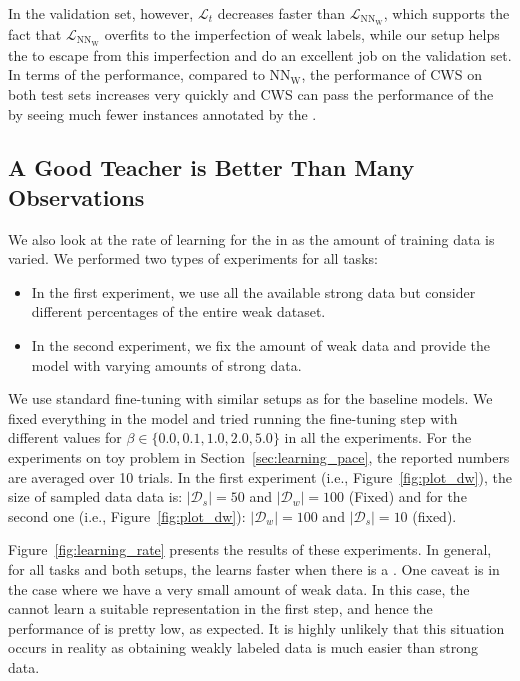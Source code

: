 In the validation set, however, $\mathcal{L}_t$ decreases faster than $\mathcal{L}_{\text{NN}_{\text{W}}}$, which supports the fact that $\mathcal{L}_{\text{NN}_{\text{W}}}$ overfits to the imperfection of weak labels, while our setup helps the \tnet to escape from this imperfection and do an excellent job on the validation set.
%
In terms of the performance, compared to $\text{NN}_{\text{W}}$, the performance of CWS on both test sets increases very quickly and CWS can pass the performance of the \wa by seeing much fewer instances annotated by the \wa.
\subsection{A Good Teacher is Better Than Many Observations} 

We also look at the rate of learning for the \std in \fwl as the amount of training data is varied. We performed two types of experiments for all tasks:
%
\begin{itemize}
    \item In the first experiment, we use all the available strong data but consider different percentages of the entire weak dataset.
    \item In the second experiment, we fix the amount of weak data and provide the model with varying amounts of strong data.
\end{itemize} 
We use standard fine-tuning with similar setups as for the baseline models. 
We fixed everything in the model and tried running the fine-tuning step with different values for $\beta \in \{0.0, 0.1, 1.0, 2.0, 5.0\}$ in all the experiments.
For the experiments on toy problem in Section~\ref{sec:learning_pace}, the reported numbers are averaged over 10 trials. In the first experiment (i.e., Figure~\ref{fig:plot_dw}), the size of sampled data data is: $|\mathcal{D}_s| = 50$ and $|\mathcal{D}_w| = 100$ (Fixed) and for the second one (i.e., Figure~\ref{fig:plot_dw}): $|\mathcal{D}_w| = 100$ and $|\mathcal{D}_s| = 10$ (fixed). 

Figure~\ref{fig:learning_rate} presents the results of these experiments. In general, for all tasks and both setups, the \std learns faster when there is a \tch.
One caveat is in the case where we have a very small amount of weak data. In this case, the \std cannot learn a suitable representation in the first step, and hence the performance of \fwl is pretty low, as expected. It is highly unlikely that this situation occurs in reality as obtaining weakly labeled data is much easier than strong data.

